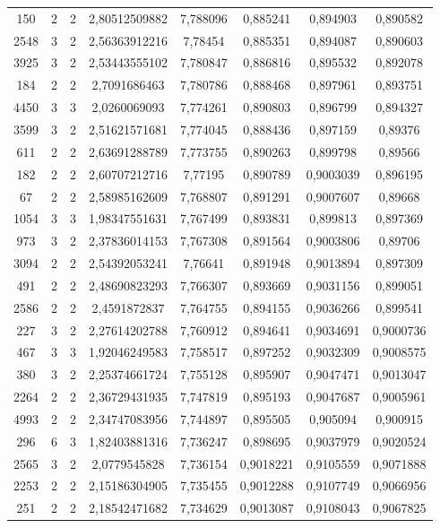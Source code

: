 \begin{longtable}{|c|c|c|c|c|c|c|c|}
150 & 2 & 2 & 2,80512509882 & 7,788096 & 0,885241 & 0,894903 & 0,890582 \\
2548 & 3 & 2 & 2,56363912216 & 7,78454 & 0,885351 & 0,894087 & 0,890603 \\
3925 & 3 & 2 & 2,53443555102 & 7,780847 & 0,886816 & 0,895532 & 0,892078 \\
184 & 2 & 2 & 2,7091686463 & 7,780786 & 0,888468 & 0,897961 & 0,893751 \\
4450 & 3 & 3 & 2,0260069093 & 7,774261 & 0,890803 & 0,896799 & 0,894327 \\
3599 & 3 & 2 & 2,51621571681 & 7,774045 & 0,888436 & 0,897159 & 0,89376 \\
611 & 2 & 2 & 2,63691288789 & 7,773755 & 0,890263 & 0,899798 & 0,89566 \\
182 & 2 & 2 & 2,60707212716 & 7,77195 & 0,890789 & 0,9003039 & 0,896195 \\
67 & 2 & 2 & 2,58985162609 & 7,768807 & 0,891291 & 0,9007607 & 0,89668 \\
1054 & 3 & 3 & 1,98347551631 & 7,767499 & 0,893831 & 0,899813 & 0,897369 \\
973 & 3 & 2 & 2,37836014153 & 7,767308 & 0,891564 & 0,9003806 & 0,89706 \\
3094 & 2 & 2 & 2,54392053241 & 7,76641 & 0,891948 & 0,9013894 & 0,897309 \\
491 & 2 & 2 & 2,48690823293 & 7,766307 & 0,893669 & 0,9031156 & 0,899051 \\
2586 & 2 & 2 & 2,4591872837 & 7,764755 & 0,894155 & 0,9036266 & 0,899541 \\
227 & 3 & 2 & 2,27614202788 & 7,760912 & 0,894641 & 0,9034691 & 0,9000736 \\
467 & 3 & 3 & 1,92046249583 & 7,758517 & 0,897252 & 0,9032309 & 0,9008575 \\
380 & 3 & 2 & 2,25374661724 & 7,755128 & 0,895907 & 0,9047471 & 0,9013047 \\
2264 & 2 & 2 & 2,36729431935 & 7,747819 & 0,895193 & 0,9047687 & 0,9005961 \\
4993 & 2 & 2 & 2,34747083956 & 7,744897 & 0,895505 & 0,905094 & 0,900915 \\
296 & 6 & 3 & 1,82403881316 & 7,736247 & 0,898695 & 0,9037979 & 0,9020524 \\
2565 & 3 & 2 & 2,0779545828 & 7,736154 & 0,9018221 & 0,9105559 & 0,9071888 \\
2253 & 2 & 2 & 2,15186304905 & 7,735455 & 0,9012288 & 0,9107749 & 0,9066956 \\
251 & 2 & 2 & 2,18542471682 & 7,734629 & 0,9013087 & 0,9108043 & 0,9067825 \\

\end{longtable}
